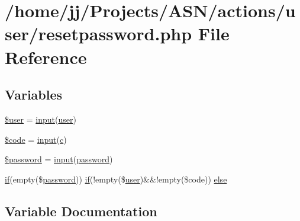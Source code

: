 \hypertarget{actions_2user_2resetpassword_8php}{}\section{/home/jj/\+Projects/\+A\+S\+N/actions/user/resetpassword.php File Reference}
\label{actions_2user_2resetpassword_8php}
\subsection*{Variables}
\begin{DoxyCompactItemize}
\item 
\hyperlink{actions_2user_2resetpassword_8php_a598ca4e71b15a1313ec95f0df1027ca5}{\$user} = \hyperlink{ossn_8lib_8input_8php_a64ebee98b041c4f75f71ed3cd73cc8ed}{input}(\textquotesingle{}\hyperlink{ossn_8config_8db_8example_8php_a802544b7ba9f79bbf24ef67773d53bed}{user}\textquotesingle{})
\item 
\hyperlink{actions_2user_2resetpassword_8php_a7949acdaecc70b9f035c12a7069db132}{\$code} = \hyperlink{ossn_8lib_8input_8php_a64ebee98b041c4f75f71ed3cd73cc8ed}{input}(\textquotesingle{}\hyperlink{fullpage_2plugin_8min_8js_a92587cc54822a9f38871b2d0e0952da1}{c}\textquotesingle{})
\item 
\hyperlink{actions_2user_2resetpassword_8php_a607686ef9f99ea7c42f4f3dd3dbb2b0d}{\$password} = \hyperlink{ossn_8lib_8input_8php_a64ebee98b041c4f75f71ed3cd73cc8ed}{input}(\textquotesingle{}\hyperlink{actions_2account_8php_a3ef39d3ee8b2bcca6a288308549ccb44}{password}\textquotesingle{})
\item 
\hyperlink{jquery_8tokeninput_8js_ad8dd46a3cbc004569e34401e9e71771a}{if}(empty(\$\hyperlink{actions_2account_8php_a3ef39d3ee8b2bcca6a288308549ccb44}{password})) \hyperlink{jquery_8tokeninput_8js_ad8dd46a3cbc004569e34401e9e71771a}{if}(!empty(\$\hyperlink{ossn_8config_8db_8example_8php_a802544b7ba9f79bbf24ef67773d53bed}{user})\&\&!empty(\$code)) \hyperlink{actions_2user_2resetpassword_8php_a7c272fa17492e9ff4bcc2b8babb0fee4}{else}
\end{DoxyCompactItemize}


\subsection{Variable Documentation}
